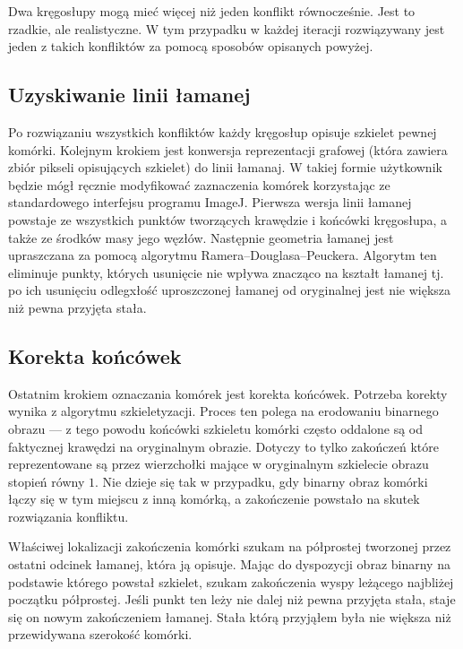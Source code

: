 \documentclass[declaration,shortabstract,mgr]{iithesis}
\begin{document}
Dwa kręgosłupy mogą mieć więcej niż jeden konflikt równocześnie. Jest to rzadkie, ale realistyczne.
W tym przypadku w każdej iteracji rozwiązywany jest jeden z takich konfliktów za pomocą sposobów opisanych powyżej.

\subsection{Uzyskiwanie linii łamanej}

Po rozwiązaniu wszystkich konfliktów każdy kręgosłup opisuje szkielet pewnej komórki.
Kolejnym krokiem jest konwersja reprezentacji grafowej (która zawiera zbiór pikseli opisujących szkielet) do linii łamanaj.
W takiej formie użytkownik będzie mógł ręcznie modyfikować zaznaczenia komórek korzystając ze standardowego interfejsu programu ImageJ.
Pierwsza wersja linii łamanej powstaje ze wszystkich punktów tworzących krawędzie i końcówki kręgosłupa, a także ze środków masy jego węzłów.
Następnie geometria łamanej jest upraszczana za pomocą algorytmu Ramera--Douglasa--Peuckera\cite{algo:ramer}\cite{algo:douglas-peucker}.
Algorytm ten eliminuje punkty, których usunięcie nie wpływa znacząco na kształt łamanej tj. po ich usunięciu odlegxłość uproszczonej łamanej od oryginalnej jest nie większa niż pewna przyjęta stała.

\subsection{Korekta końcówek}
\label{sec:correct-endpoints}

Ostatnim krokiem oznaczania komórek jest korekta końcówek.
Potrzeba korekty wynika z algorytmu szkieletyzacji.
Proces ten polega na erodowaniu binarnego obrazu --- z tego powodu końcówki szkieletu komórki często oddalone są od faktycznej krawędzi na oryginalnym obrazie.
Dotyczy to tylko zakończeń które reprezentowane są przez wierzchołki mające w oryginalnym szkielecie obrazu stopień równy $1$.
Nie dzieje się tak w przypadku, gdy binarny obraz komórki łączy się w tym miejscu z inną komórką, a zakończenie powstało na skutek rozwiązania konfliktu.

Właściwej lokalizacji zakończenia komórki szukam na półprostej tworzonej przez ostatni odcinek łamanej, która ją opisuje.
Mając do dyspozycji obraz binarny na podstawie którego powstał szkielet, szukam zakończenia wyspy leżącego najbliżej początku półprostej.
Jeśli punkt ten leży nie dalej niż pewna przyjęta stała, staje się on nowym zakończeniem łamanej.
Stała którą przyjąłem była nie większa niż przewidywana szerokość komórki.
\end{document}
